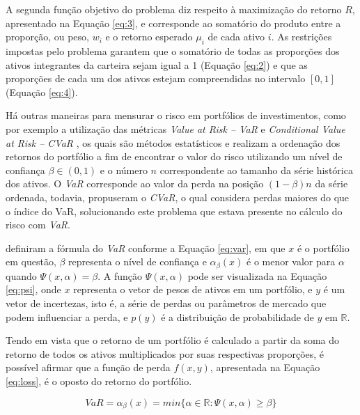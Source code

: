 \documentclass[11pt]{article}
\begin{document}
    A segunda função objetivo do problema diz respeito à maximização do retorno $R$, apresentado na Equação \ref{eq:3}, e corresponde ao somatório do produto entre a proporção, ou peso, $w_i$ e o retorno esperado $\mu_i$ de cada ativo $i$.
    As restrições impostas pelo problema garantem que o somatório de todas as proporções dos ativos integrantes da carteira sejam igual a 1 (Equação \ref{eq:2}) e que as proporções de cada um dos ativos estejam compreendidas no intervalo $[0,1]$ (Equação \ref{eq:4}).

    
    Há outras maneiras para mensurar o risco em portfólios de investimentos, como por exemplo a utilização das métricas \textit{Value at Risk -- VaR} \cite{var} e \textit{Conditional Value at Risk -- CVaR} \cite{Rockafellar2000}, os quais são métodos estatísticos e realizam a ordenação dos retornos do portfólio a fim de encontrar o valor do risco utilizando um nível de confiança $\beta \in (0,1)$ e o número $n$ correspondente ao tamanho da série histórica dos ativos. O \textit{VaR} corresponde ao valor da perda na posição $(1-\beta)n$ da série ordenada, todavia,  propuseram o \textit{CVaR}, o qual considera perdas maiores do que o índice do VaR, solucionando este problema que estava presente no cálculo do risco com \textit{VaR}. 
    
    
     definiram a fórmula do \textit{VaR} conforme a Equação \ref{eq:var}, em que $x$ é o portfólio em questão, $\beta$ representa o nível de confiança e $\alpha_{\beta}(x)$ é o menor valor para $\alpha$ quando $\Psi(x,\alpha) = \beta$. A função $\Psi(x, \alpha)$ pode ser visualizada na Equação \ref{eq:psi}, onde $x$ representa o vetor de pesos de ativos em um portfólio, e $y$ é um vetor de incertezas, isto é, a série de perdas ou parâmetros de mercado que podem influenciar a perda, e $p(y)$ é a distribuição de probabilidade de $y$ em $\mathbb{R}$. 
    
    Tendo em vista que o retorno de um portfólio é calculado a partir da soma do retorno de todos os ativos multiplicados por suas respectivas proporções, é possível afirmar que a função de perda $f(x,y)$, apresentada na Equação \ref{eq:loss}, é o oposto do retorno do portfólio. \cite{Rockafellar2000}
    

    
    \begin{equation} \label{eq:var}
        VaR = \alpha_{\beta}(x) = min\{\alpha \in \mathbb{R}: \Psi (x,\alpha) \geq \beta \}
    \end{equation}
    
\end{document}
